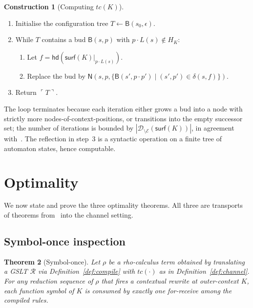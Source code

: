 \documentclass[11pt]{article}
\theoremstyle{plain}
\newtheorem{theorem}{Theorem}[section]
\theoremstyle{definition}
\newtheorem{construction}[theorem]{Construction}
\theoremstyle{remark}
\newcommand{\reflect}[1]{\ulcorner #1 \urcorner}
\newcommand{\hd}{\mathsf{hd}}
\newcommand{\dom}{\mathcal{D}}
\newcommand{\edges}{\mathcal{E}}
\newcommand{\surface}{\mathsf{surf}}
\begin{document}
\begin{construction}[Computing $tc(K)$]\label{constr:tc}\rm
\begin{enumerate}[leftmargin=2em,label=\arabic*.]
  \item Initialise the configuration tree $T \gets \mathsf{B}(s_{0}, \epsilon)$.
  \item While $T$ contains a bud $\mathsf{B}(s, p)$ with
        $p \cdot L(s) \notin H_{K}$:
    \begin{enumerate}[label=2.\arabic*]
      \item Let $f = \hd(\surface(K)|_{p \cdot L(s)})$.
      \item Replace the bud by
            $\mathsf{N}(s, p, \{\mathsf{B}(s', p \cdot p') \mid (s', p') \in \delta(s, f)\})$.
    \end{enumerate}
  \item Return $\reflect{T}$.
\end{enumerate}
\end{construction}

\noindent
The loop terminates because each iteration either grows a bud into a node
with strictly more nodes-of-context-positions, or transitions into the
empty successor set; the number of iterations is bounded by
$|\dom_{\setminus\edges}(\surface(K))|$, in agreement
with~\cite[Theorem~1]{BouwmanErkens2022}. The reflection in step~3 is a
syntactic operation on a finite tree of automaton states, hence
computable.

\section{Optimality}\label{sec:optimality}

We now state and prove the three optimality theorems. All three are
transports of theorems from~\cite{BouwmanErkens2022} into the channel
setting.

\subsection{Symbol-once inspection}

\begin{theorem}[Symbol-once]\label{thm:symbol-once}
Let $\rho$ be a rho-calculus term obtained by translating a GSLT
$\mathcal{R}$ via Definition~\ref{def:compile} with $tc(\cdot)$ as in
Definition~\ref{def:channel}. For any reduction sequence of $\rho$ that
fires a contextual rewrite at outer-context $K$, each function symbol of
$K$ is consumed by exactly one
\textsf{for}-receive among the compiled rules.
\end{theorem}
\end{document}
